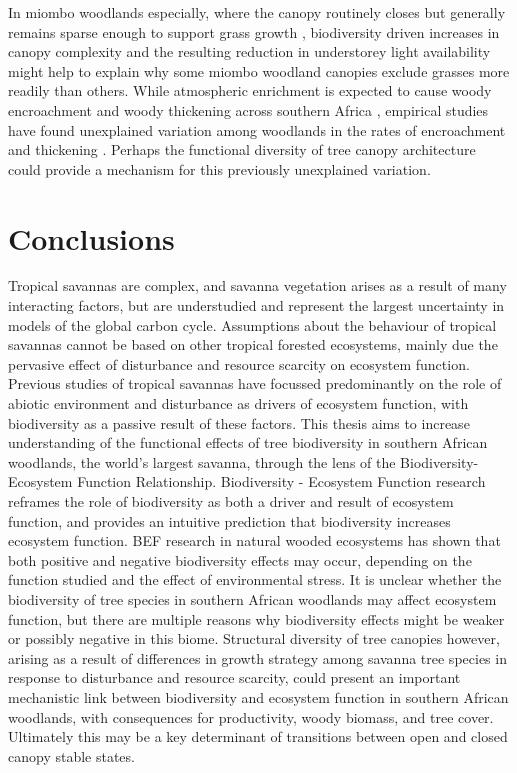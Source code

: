 \begin{refsection}
In miombo woodlands especially, where the canopy routinely closes but generally remains sparse enough to support grass growth \citep{Frost1996}, biodiversity driven increases in canopy complexity and the resulting reduction in understorey light availability might help to explain why some miombo woodland canopies exclude grasses more readily than others. While atmospheric \co{} enrichment is expected to cause woody encroachment and woody thickening across southern Africa \citep{Stevens2016b}, empirical studies have found unexplained variation among woodlands in the rates of encroachment and thickening \citep{Lewis2009}. Perhaps the functional diversity of tree canopy architecture could provide a mechanism for this previously unexplained variation. 

\section{Conclusions}
\label{background:sec:conclusion}

Tropical savannas are complex, and savanna vegetation arises as a result of many interacting factors, but are understudied and represent the largest uncertainty in models of the global carbon cycle. Assumptions about the behaviour of tropical savannas cannot be based on other tropical forested ecosystems, mainly due the pervasive effect of disturbance and resource scarcity on ecosystem function. Previous studies of tropical savannas have focussed predominantly on the role of abiotic environment and disturbance as drivers of ecosystem function, with biodiversity as a passive result of these factors. This thesis aims to increase understanding of the functional effects of tree biodiversity in southern African woodlands, the world's largest savanna, through the lens of the Biodiversity-Ecosystem Function Relationship. Biodiversity - Ecosystem Function research reframes the role of biodiversity as both a driver and result of ecosystem function, and provides an intuitive prediction that biodiversity increases ecosystem function. BEF research in natural wooded ecosystems has shown that both positive and negative biodiversity effects may occur, depending on the function studied and the effect of environmental stress. It is unclear whether the biodiversity of tree species in southern African woodlands may affect ecosystem function, but there are multiple reasons why biodiversity effects might be weaker or possibly negative in this biome. Structural diversity of tree canopies however, arising as a result of differences in growth strategy among savanna tree species in response to disturbance and resource scarcity, could present an important mechanistic link between biodiversity and ecosystem function in southern African woodlands, with consequences for productivity, woody biomass, and tree cover. Ultimately this may be a key determinant of transitions between open and closed canopy stable states. 

\newpage{}
\FloatBarrier{}
\begingroup
{}
\printbibliography[heading=subbibintoc]
\endgroup

\end{refsection}

